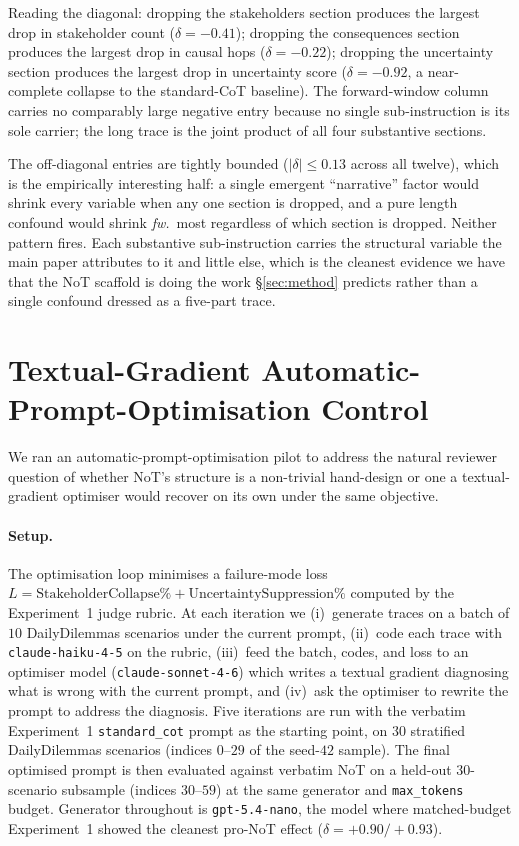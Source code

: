 \documentclass[11pt]{article}
\begin{document}
Reading the diagonal: dropping the stakeholders section produces
the largest drop in stakeholder count ($\delta = -0.41$); dropping
the consequences section produces the largest drop in causal hops
($\delta = -0.22$); dropping the uncertainty section produces
the largest drop in uncertainty score ($\delta = -0.92$, a
near-complete collapse to the standard-CoT baseline). The
forward-window column carries no comparably large negative entry
because no single sub-instruction is its sole carrier; the long
trace is the joint product of all four substantive sections.

The off-diagonal entries are tightly bounded ($|\delta| \le 0.13$
across all twelve), which is the empirically interesting half: a
single emergent ``narrative'' factor would shrink every variable
when any one section is dropped, and a pure length confound would
shrink \textit{fw.}\ most regardless of which section is dropped.
Neither pattern fires. Each substantive sub-instruction carries
the structural variable the main paper attributes to it and
little else, which is the cleanest evidence we have that the
NoT scaffold is doing the work \S\ref{sec:method} predicts
rather than a single confound dressed as a five-part trace.

\section{Textual-Gradient Automatic-Prompt-Optimisation Control}
\label{app:textgrad}

We ran an automatic-prompt-optimisation pilot to address the
natural reviewer question of whether NoT's structure is a
non-trivial hand-design or one a textual-gradient optimiser
\cite{yuksekgonul2024textgrad} would recover on its own under the
same objective.

\paragraph{Setup.} The optimisation loop minimises a failure-mode
loss $L = \text{StakeholderCollapse\%} + \text{UncertaintySuppression\%}$
computed by the Experiment~1 judge rubric. At each iteration we
(i)~generate traces on a batch of $10$ DailyDilemmas scenarios
under the current prompt, (ii)~code each trace with
\texttt{claude-haiku-4-5} on the rubric, (iii)~feed the batch,
codes, and loss to an optimiser model (\texttt{claude-sonnet-4-6})
which writes a textual gradient diagnosing what is wrong with the
current prompt, and (iv)~ask the optimiser to rewrite the prompt
to address the diagnosis. Five iterations are run with the
verbatim Experiment~1 \texttt{standard\_cot} prompt as the
starting point, on $30$ stratified DailyDilemmas scenarios
(indices $0$--$29$ of the seed-$42$ sample). The final optimised
prompt is then evaluated against verbatim NoT on a held-out
$30$-scenario subsample (indices $30$--$59$) at the same generator
and \texttt{max\_tokens} budget. Generator throughout is
\texttt{gpt-5.4-nano}, the model where matched-budget Experiment~1
showed the cleanest pro-NoT effect ($\delta = +0.90/+0.93$).
\end{document}
